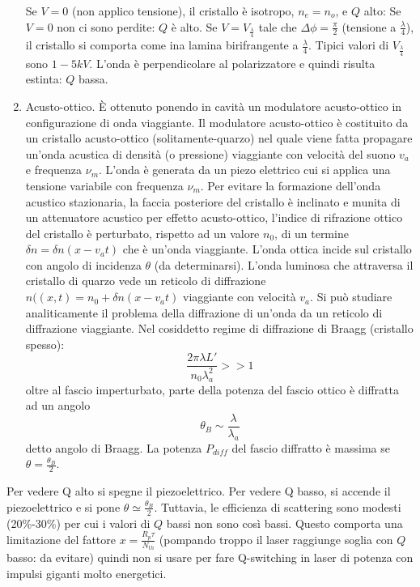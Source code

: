 \documentclass{book}
\def \D {\Delta}
\def \l {\lambda}
\theoremstyle{remark}
\begin{document}
\begin{enumerate}
Se $V=0$ (non applico tensione), il cristallo è isotropo, $n_e = n_o$, e $Q$ alto:
Se $V=0$ non ci sono perdite: $Q$ è alto.
Se $V=V_{\frac{\l}{4}}$ tale che $\D\phi=\frac{\pi}{2}$ (tensione a $\frac{\l}{4}$), il cristallo si comporta come ina lamina birifrangente a $\frac{\l}{4}$. Tipici valori di $V_{\frac{\l}{4}}$ sono $1-5 kV$.
L'onda è perpendicolare al polarizzatore e quindi risulta estinta: $Q$ bassa.
\item Acusto-ottico. È ottenuto ponendo in cavità un modulatore acusto-ottico in configurazione di onda viaggiante.
Il modulatore acusto-ottico è costituito da un cristallo acusto-ottico (solitamente-quarzo) nel quale viene fatta propagare un'onda acustica di densità (o pressione) viaggiante con velocità del suono $v_a$ e frequenza $\nu_m$. L'onda è generata da un piezo elettrico cui si applica una tensione variabile con frequenza $\nu_m$. Per evitare la formazione dell'onda acustico stazionaria, la faccia posteriore del cristallo è inclinato e munita di un attenuatore acustico per effetto acusto-ottico, l'indice di rifrazione ottico del cristallo è perturbato, rispetto ad un valore $n_0$, di un termine $\delta n = \delta n (x - v_a t)$ che è un'onda viaggiante. L'onda ottica incide sul cristallo con angolo di incidenza $\theta$ (da determinarsi).
L'onda luminosa che attraversa il cristallo di quarzo vede un reticolo di diffrazione $n((x,t) = n_0 + \delta n (x - v_a t)$ viaggiante con velocità $v_a$. Si può studiare analiticamente il problema della diffrazione di un'onda da un reticolo di diffrazione viaggiante. Nel cosiddetto regime di diffrazione di Braagg (cristallo spesso):
\begin{equation*}
\frac{2\pi \l L'}{n_0 \l_a^2} >> 1
\end{equation*}
oltre al fascio imperturbato, parte della potenza del fascio ottico è diffratta ad un angolo
\begin{equation*}
\theta_B \sim \frac{\l}{\l_a}
\end{equation*}
detto angolo di Braagg.
La potenza $P_{diff}$ del fascio diffratto è massima se $\theta = \frac{\theta_B}{2}$.
\end{enumerate}
Per vedere Q alto si spegne il piezoelettrico.
Per vedere Q basso, si accende il piezoelettrico e si pone $\theta \simeq \frac{\theta_B}{2}$.
Tuttavia, le efficienza di scattering sono modesti (20\%-30\%) per cui i valori di $Q$ bassi non sono così bassi.
Questo comporta una limitazione del fattore $x = \frac{R_p \tau}{N_{th}}$ (pompando troppo il laser raggiunge soglia con $Q$ basso: da evitare) quindi non si usare per fare Q-switching in laser di potenza con impulsi giganti molto energetici.
\end{document}
